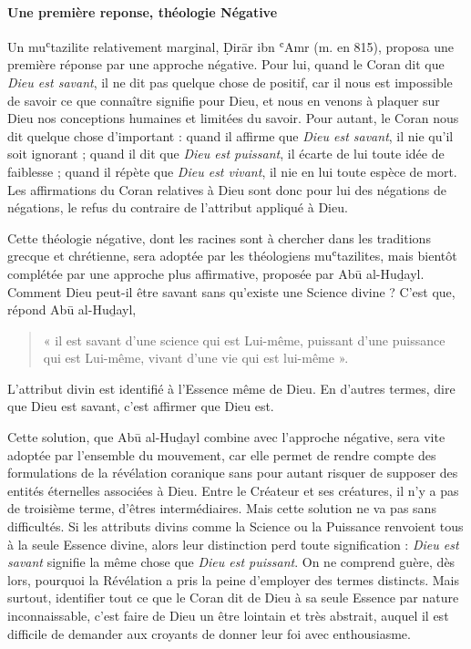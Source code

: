 \paragraph{Une première reponse, théologie Négative } Un muʿtazilite relativement marginal, Ḍirār ibn ʿAmr (m. en 815),
proposa une première réponse par une approche négative. Pour lui, quand
le Coran dit que \emph{Dieu est savant}, il ne dit pas quelque chose de
positif, car il nous est impossible de savoir ce que connaître signifie
pour Dieu, et nous en venons à plaquer sur Dieu nos conceptions humaines
et limitées du savoir. Pour autant, le Coran nous dit quelque chose
d'important : quand il affirme que \emph{Dieu est savant}, il nie qu'il
soit ignorant ; quand il dit que \emph{Dieu est puissant}, il écarte de
lui toute idée de faiblesse ; quand il répète que \emph{Dieu est
vivant}, il nie en lui toute espèce de mort. Les affirmations du Coran
relatives à Dieu sont donc pour lui des négations de négations, le refus
du contraire de l'attribut appliqué à Dieu.

Cette théologie négative, dont les racines sont à chercher dans les
traditions grecque et chrétienne, sera adoptée par les théologiens
muʿtazilites, mais bientôt complétée par une approche plus affirmative,
proposée par Abū al-Huḏayl. Comment Dieu peut-il être savant sans
qu'existe une Science divine ? C'est que, répond Abū al-Huḏayl,
\begin{quote}
    « il est
savant d'une science qui est Lui-même, puissant d'une puissance qui est
Lui-même, vivant d'une vie qui est lui-même ».
\end{quote} 
L'attribut divin \label{par:AttributdivinMutazilite} est
identifié à l'Essence même de Dieu. En d'autres termes, dire que Dieu
est savant, c'est affirmer que Dieu est.

Cette solution, que Abū al-Huḏayl combine avec l'approche négative, sera
vite adoptée par l'ensemble du mouvement, car elle permet de rendre
compte des formulations de la révélation coranique sans pour autant
risquer de supposer des entités éternelles associées à Dieu. Entre le
Créateur et ses créatures, il n'y a pas de troisième terme, d'êtres
intermédiaires. Mais cette solution ne va pas sans difficultés. Si les
attributs divins comme la Science ou la Puissance renvoient tous à la
seule Essence divine, alors leur distinction perd toute signification :
\emph{Dieu est savant} signifie la même chose que \emph{Dieu est
puissant}. On ne comprend guère, dès lors, pourquoi la Révélation a pris
la peine d'employer des termes distincts. Mais surtout, identifier tout
ce que le Coran dit de Dieu à sa seule Essence par nature
inconnaissable, c'est faire de Dieu un être lointain et très abstrait,
auquel il est difficile de
demander aux croyants de donner leur foi avec enthousiasme.

